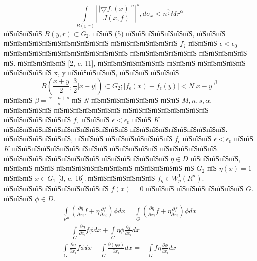 \documentclass[a5paper, 12pt, openbib]{report}
\begin{document}
\begin{equation}
\int\limits_{B(y,r)}\left|\frac{|\bigtriangledown f_{\epsilon}(x)|^{n}}{J(x,f)}\right|^s, d\sigma_{x}<n^{\frac{n}{2}}Mr^\alpha
\end{equation}
пїЅпїЅпїЅпїЅ $B(y,r)\subset G_2$.
пїЅпїЅ (5) пїЅпїЅпїЅпїЅпїЅпїЅпїЅ, пїЅпїЅпїЅ пїЅпїЅпїЅпїЅпїЅпїЅпїЅпїЅпїЅпїЅпїЅ пїЅпїЅпїЅпїЅпїЅпїЅпїЅ $f_?$ пїЅпїЅпїЅ $\epsilon<\epsilon_0$ пїЅпїЅпїЅпїЅпїЅпїЅпїЅпїЅпїЅпїЅпїЅпїЅпїЅ пїЅпїЅпїЅпїЅпїЅпїЅпїЅ пїЅпїЅпїЅпїЅпїЅ пїЅ. пїЅпїЅпїЅпїЅпїЅ [2, c. 11], пїЅпїЅпїЅпїЅпїЅпїЅпїЅ пїЅпїЅпїЅ пїЅпїЅпїЅпїЅпїЅ пїЅпїЅпїЅпїЅпїЅ x, y пїЅпїЅпїЅпїЅпїЅ, пїЅпїЅпїЅ пїЅпїЅпїЅ 
$$
B\left(\frac{x+y}{2},\frac{3}{2}|x-y|\right)\subset G_{2}; |f_{\epsilon}(x)-f_{\epsilon}(y)|<N|x-y|^\beta
$$
пїЅпїЅпїЅ $\beta=\frac{\alpha-n+s}{s}$ пїЅ $N$ пїЅпїЅпїЅпїЅпїЅпїЅпїЅ пїЅпїЅ $M,n,s,\alpha$.
пїЅпїЅпїЅпїЅпїЅ пїЅпїЅпїЅпїЅпїЅпїЅпїЅ пїЅпїЅпїЅпїЅпїЅпїЅпїЅпїЅпїЅ пїЅпїЅпїЅпїЅпїЅпїЅпїЅ $f_\epsilon$ пїЅпїЅпїЅ $\epsilon<\epsilon_0$ пїЅпїЅ $K$ пїЅпїЅпїЅпїЅпїЅпїЅпїЅпїЅпїЅпїЅпїЅпїЅпїЅ пїЅпїЅпїЅпїЅпїЅпїЅпїЅпїЅпїЅпїЅ. пїЅпїЅпїЅпїЅпїЅпїЅпїЅ, пїЅпїЅпїЅ пїЅпїЅпїЅпїЅпїЅпїЅпїЅ $f_\epsilon$ пїЅпїЅпїЅ $\epsilon<\epsilon_0$ пїЅпїЅ $K$ пїЅпїЅпїЅпїЅпїЅпїЅпїЅпїЅпїЅпїЅ пїЅпїЅпїЅпїЅпїЅ пїЅпїЅпїЅпїЅпїЅпїЅ. пїЅпїЅпїЅпїЅпїЅпїЅпїЅпїЅпїЅпїЅ пїЅпїЅпїЅпїЅпїЅпїЅпїЅ $\eta\in D$ пїЅпїЅпїЅпїЅпїЅ, пїЅпїЅпїЅ пїЅпїЅ пїЅпїЅпїЅпїЅпїЅпїЅпїЅпїЅ пїЅпїЅпїЅпїЅпїЅ пїЅ $G_2$ пїЅ  $\eta(x)=1$ пїЅпїЅпїЅ $x\in G_1$ [3, c. 16]. пїЅпїЅпїЅпїЅпїЅпїЅпїЅ $f_{\eta}\in W_{p}^{1} (R^n)$. пїЅпїЅпїЅпїЅпїЅпїЅпїЅпїЅпїЅпїЅпїЅ $f(x)=0$ пїЅпїЅпїЅ пїЅпїЅпїЅпїЅпїЅпїЅпїЅ $G$. пїЅпїЅпїЅ $\phi\in D$.
\begin{multline}
\int\limits_{R^n}\left(\frac{\partial\eta}{\partial x_i}f+\eta\frac{\partial f}{\partial x_i}\right)\phi dx
= \int\limits_{G}\left(\frac{\partial\eta}{\partial x_i}f+\eta\frac{\partial f}{\partial x_i}\right)\phi dx\\
=\int\limits_{G}\frac{\partial\eta}{\partial x_i}f\phi dx+\int\limits_{G}\eta\phi\frac{\partial f}{\partial x_i}dx=\\
\int\limits_{G}\frac{\partial\eta}{\partial x_i}f\phi dx-\int\limits_{G}\frac{\partial(\eta\phi)}{\partial x_i}dx=-\int\limits_{G}f\eta\frac{\partial\phi}{\partial x_i}dx\\
\end{multline}
\end{document}

